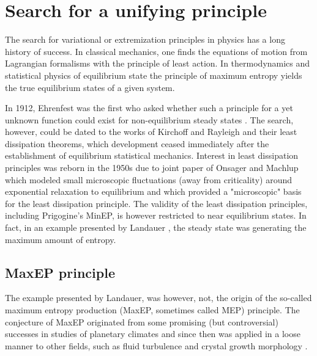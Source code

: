 \documentclass[a4paper,12pt]{article}
\begin{document}
\section{Search for a unifying principle}
\label{UnifyingPrinciple}
The search for variational or extremization principles in physics has a long history of success. In classical mechanics, one finds the equations of motion from Lagrangian formalisms with the principle of least action. In thermodynamics and statistical physics of equilibrium state the principle of maximum entropy yields the true equilibrium states of a given system. 

In 1912, Ehrenfest was the first who asked whether such a principle for a yet unknown function could exist for non-equilibrium steady states \cite{Dewar:2014ek}.
The search, however, could be dated to the works of Kirchoff and Rayleigh and their least dissipation theorems, which development ceased immediately after the establishment of equilibrium statistical mechanics.
Interest in least dissipation principles was reborn in the 1950s due to joint paper of Onsager and Machlup \cite{Onsager:3UFhYpWV} which modeled small microscopic fluctuations (away from criticality) around exponential relaxation to equilibrium and which provided a "microscopic" basis for the least dissipation principle. The validity of the least dissipation principles, including Prigogine's MinEP, is however restricted to near equilibrium states. In fact, in an example presented by Landauer \cite{Landauer:pJ4RYJRG}, the steady state was generating the maximum amount of entropy.

\subsection{MaxEP principle}
\label{MaxEPSection}
The example presented by Landauer, was however, not, the origin of the so-called maximum entropy production (MaxEP, sometimes called MEP) principle. The conjecture of MaxEP originated from some promising (but controversial) successes in studies of planetary climates \cite{Lorenz:J80tzZkl, Paltridge:2007jf, Kleidon:1339033} and since then was applied in a loose manner to other fields, such as fluid turbulence \cite{Ozawa:2003jt, MALKUS:2003ix} and crystal growth morphology \cite{Martyushev:2006ge}.
\end{document}
